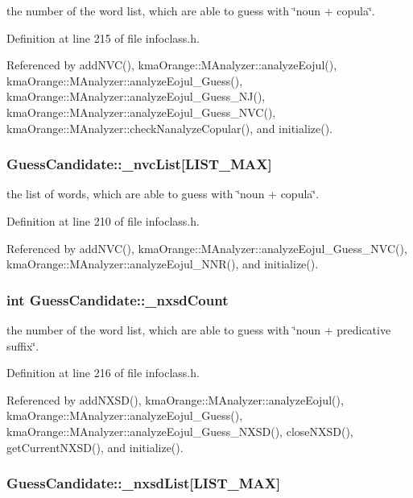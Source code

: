 the number of the word list, which are able to guess with \char`\"{}noun + copula\char`\"{}. 



Definition at line 215 of file infoclass.h.

Referenced by addNVC(), kmaOrange::MAnalyzer::analyzeEojul(), kmaOrange::MAnalyzer::analyzeEojul\_\-Guess(), kmaOrange::MAnalyzer::analyzeEojul\_\-Guess\_\-NJ(), kmaOrange::MAnalyzer::analyzeEojul\_\-Guess\_\-NVC(), kmaOrange::MAnalyzer::checkNanalyzeCopular(), and initialize().\hypertarget{classGuessCandidate_03874c97800c94410000fabce43caa7b}{
\subsubsection[{\_\-nvcList}]{ {\bf GuessCandidate::\_\-nvcList}\mbox{[}LIST\_\-MAX\mbox{]}}}
\label{classGuessCandidate_03874c97800c94410000fabce43caa7b}


the list of words, which are able to guess with \char`\"{}noun + copula\char`\"{}. 



Definition at line 210 of file infoclass.h.

Referenced by addNVC(), kmaOrange::MAnalyzer::analyzeEojul\_\-Guess\_\-NVC(), kmaOrange::MAnalyzer::analyzeEojul\_\-NNR(), and initialize().\hypertarget{classGuessCandidate_d55bb019c674eac31e008aabd991cf09}{
\subsubsection[{\_\-nxsdCount}]{\setlength{\rightskip}{0pt plus 5cm}int {\bf GuessCandidate::\_\-nxsdCount}}}
\label{classGuessCandidate_d55bb019c674eac31e008aabd991cf09}


the number of the word list, which are able to guess with \char`\"{}noun + predicative suffix\char`\"{}. 



Definition at line 216 of file infoclass.h.

Referenced by addNXSD(), kmaOrange::MAnalyzer::analyzeEojul(), kmaOrange::MAnalyzer::analyzeEojul\_\-Guess(), kmaOrange::MAnalyzer::analyzeEojul\_\-Guess\_\-NXSD(), closeNXSD(), getCurrentNXSD(), and initialize().\hypertarget{classGuessCandidate_8eb000c2b7f13f2f2330346bdee6e652}{
\subsubsection[{\_\-nxsdList}]{ {\bf GuessCandidate::\_\-nxsdList}\mbox{[}LIST\_\-MAX\mbox{]}}}
\label{classGuessCandidate_8eb000c2b7f13f2f2330346bdee6e652}


